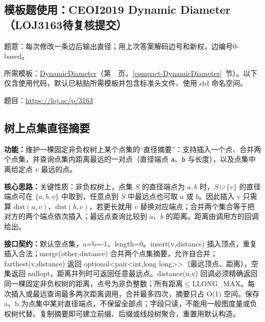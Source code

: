 

\Needspace{449pt}

\subsection*{模板题使用：CEOI2019 Dynamic Diameter（LOJ3163待复核提交）}

\label{usage-example-388}

题意：每次修改一条边后输出直径；用上次答案解码边号和新权，边编号0-based。

所需模板：\hyperref[compact-DynamicDiameter]{DynamicDiameter}（第~\pageref{compact-DynamicDiameter}~页，\ref{compact-DynamicDiameter}~节）。以下仅含使用代码，默认已粘贴所需模板并包含标准头文件、使用 std 命名空间。

题目：\url{https://loj.ac/p/3163}



\subsection{树上点集直径摘要}\label{compact-TreeDiameter}

\noindent\textbf{功能：}\allowbreak 维护一棵固定非负权树上某个点集的“直径摘要”：支持插入一个点、合并两个点集，并查询点集内距离最远的一对点（直径端点 \texttt{a}、\texttt{b} 与长度），以及点集中离给定点 $v$ 最远的点。

\textbf{核心思路：}\allowbreak 关键性质：非负权树上，点集 $S$ 的直径端点为 $a,b$ 时，$S\cup\{v\}$ 的直径端点可在 $\{a,b,v\}$ 中取到，任意点到 $S$ 中最远点也可取 $a$ 或 $b$。因此插入 $v$ 只需算 $\mathrm{dist}(a,v)$、$\mathrm{dist}(b,v)$，若更长就用 $v$ 替换对应端点；合并两个集合等于把对方的两个端点依次插入；最远点查询比较到 $a$、$b$ 的距离。距离由调用方的回调给出。



{\sloppy{}\noindent\textbf{接口契约：}默认空点集，a=b=-1、length=0。insert(v,distance) 插入顶点，重复插入合法；merge(other,distance) 合并两个点集摘要，允许自合并；farthest(v,distance) 返回 optional<pair<int,long long>>（最远顶点、距离），空集返回 nullopt，距离并列时可返回任意最远点。distance(u,v) 回调必须精确返回同一棵固定非负权树的距离，点号为非负整数；所有距离$\le$LLONG\_MAX。每次插入或最远查询最多两次距离调用，合并最多四次，摘要只占 O(1) 空间。保存 a、b 为点集中某对直径端点，不保留全部点；字段只读，不能用一般图度量或负权树代替。复制摘要即可建立前缀、后缀或线段树聚合，重置用默认构造。\par}

